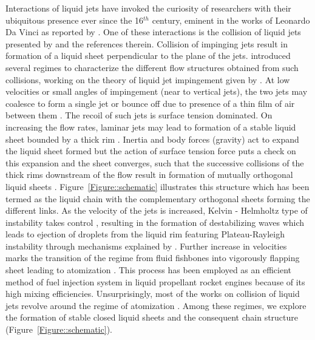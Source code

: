 \documentclass[%
aip,
sd,%
amsmath,amssymb,
preprint,%
author-year,%
]{revtex4-1}
\begin{document}
Interactions of liquid jets have invoked the curiosity of researchers with their ubiquitous presence \citep{eggers2008physics} ever since the 16$^{th}$ century, eminent in the works of Leonardo Da Vinci as reported by \cite{da1999codex}. One of these interactions is the collision of liquid jets presented by \cite{rayleigh1879capillary} and the references therein. Collision of impinging jets result in formation of a liquid sheet perpendicular to the plane of the jets. \cite{bush2004collision} introduced several regimes to characterize the different flow structures obtained from such collisions, working on the theory of liquid jet impingement given by \cite{taylor1960formation}. At low velocities or small angles of impingement (near to vertical jets), the two jets may coalesce to form a single jet or bounce off due to presence of a thin film of air between them \citep{wadhwa2013noncoalescence}. The recoil of such jets is surface tension dominated. On increasing the flow rates, laminar jets may lead to formation of a stable liquid sheet bounded by a thick rim \citep{yang2014liquid}. Inertia and body forces (gravity) act to expand the liquid sheet formed but the action of surface tension force puts a check on this expansion and the sheet converges, such that the successive collisions of the thick rims downstream of the flow result in formation of mutually orthogonal liquid sheets \citep{bush2004collision}. Figure~\ref{Figure::schematic} illustrates this structure which has been termed as the liquid chain with the complementary orthogonal sheets forming the different links. As the velocity of the jets is increased, Kelvin - Helmholtz type of instability takes control \citep{bremond2006atomization}, resulting in the formation of destabilizing waves \citep{villermaux2002life} which leads to ejection of droplets from the liquid rim featuring Plateau-Rayleigh instability through mechanisms explained by \cite{lhuissier2011destabilization}. Further increase in velocities marks the transition of the regime from fluid fishbones into vigorously flapping sheet leading to atomization \citep{ibrahim1991impinging}. This process has been employed as an efficient method of fuel injection system in liquid propellant rocket engines because of its high mixing efficiencies. Unsurprisingly, most of the works on collision of liquid jets revolve around the regime of atomization \citep{miller1960distribution,ibrahim1991impinging,bremond2006atomization,chen2013high,zheng2015numerical}. Among these regimes, we explore the formation of stable closed liquid sheets and the consequent chain structure (Figure~\ref{Figure::schematic}). \\
\end{document}
